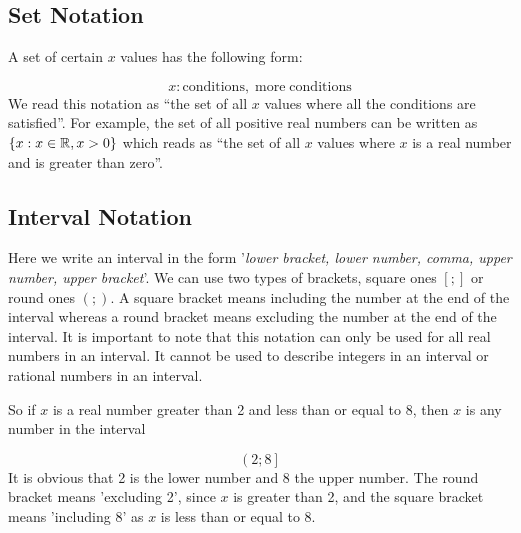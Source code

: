             \subsection{ Set Notation}
            \nopagebreak
          \label{m39337*id236056}A set of certain $x$ values has the following form:\par 
          \label{m39337*uid43}\nopagebreak\noindent{}
            
    \begin{equation}
    x:\mathrm{conditions,\; more\; conditions}\tag{1.5}
      \end{equation}
          \label{m39337*id236100}We read this notation as ``the set of all $x$ values where all the conditions are satisfied''. For example, the set of all positive real numbers can be written as $\{x:x\in \mathbb{R},x>{}0\}$ which reads as ``the set of all $x$ values where $x$ is a real number and is greater than zero''.\par 
        \label{m39337*uid44}
            \subsection{ Interval Notation}
            \nopagebreak
          \label{m39337*id236181}Here we write an interval in the form '\textsl{lower bracket, lower number, comma, upper number, upper bracket}'. We can use two types of brackets, square ones $\left[;\right]$ or round ones $\left(;\right)$. A square bracket means including the number at the end of the interval whereas a round bracket means excluding the number at the end of the interval. It is important to note that this notation can only be used for all real numbers in an interval. It cannot be used to describe integers in an interval or rational numbers in an interval.\par 
          \label{m39337*id236225}So if $x$ is a real number greater than 2 and less than or equal to 8, then $x$ is any number in the interval\par 
          \label{m39337*uid45}\nopagebreak\noindent{}
    \begin{equation}
    \left(2;8\right]\tag{1.6}
      \end{equation}
          \label{m39337*id236274}It is obvious that 2 is the lower number and 8 the upper number. The round bracket means 'excluding 2', since $x$ is greater than 2, and the square bracket means 'including 8' as $x$ is less than or equal to 8.\par 
      \label{m39337*uid46}
